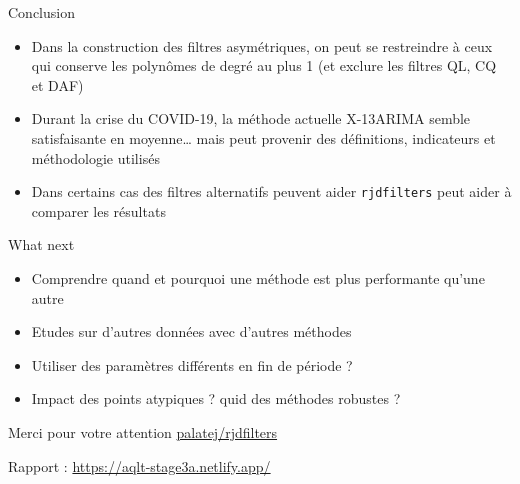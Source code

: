 \documentclass[10pt,xcolor=table,color={dvipsnames,usenames},ignorenonframetext,usepdftitle=false,french]{beamer}
\providecommand{\tightlist}{%
  \setlength{\parskip}{0pt}
  }
\newcommand\1{\mathds{1}}
\begin{document}
\begin{frame}[fragile]{Conclusion}
\protect\hypertarget{conclusion-2}{}
\begin{itemize}
\tightlist
\item
  Dans la construction des filtres asymétriques, on peut se restreindre
  à ceux qui conserve les polynômes de degré au plus 1 (et exclure les
  filtres QL, CQ et DAF)
\end{itemize}

\bigskip

\pause

\begin{itemize}
\tightlist
\item
  Durant la crise du COVID-19, la méthode actuelle X-13ARIMA semble
  satisfaisante en moyenne\ldots{} \pause mais peut provenir des
  définitions, indicateurs et méthodologie utilisés
\end{itemize}

\bigskip

\pause

\begin{itemize}
\tightlist
\item
  Dans certains cas des filtres alternatifs peuvent aider
   \texttt{rjdfilters} peut aider à comparer
  les résultats
\end{itemize}
\end{frame}

\begin{frame}{What next\bcquestion}
\protect\hypertarget{what-next}{}
\begin{itemize}
\tightlist
\item
  Comprendre quand et pourquoi une méthode est plus performante qu'une
  autre
\end{itemize}

\pause

\begin{itemize}
\tightlist
\item
  Etudes sur d'autres données avec d'autres méthodes
\end{itemize}

\pause

\begin{itemize}
\tightlist
\item
  Utiliser des paramètres différents en fin de période ?
\end{itemize}

\pause

\begin{itemize}
\tightlist
\item
  Impact des points atypiques ? quid des méthodes robustes ?
\end{itemize}
\end{frame}

\begin{frame}{Merci pour votre attention}
\protect\hypertarget{merci-pour-votre-attention}{}
\href{https://github.com/palatej/rjdfilters}{\faGithub{} palatej/rjdfilters}

Rapport : \url{https://aqlt-stage3a.netlify.app/}
\end{frame}
\end{document}
